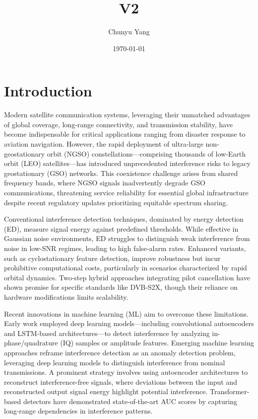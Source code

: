 \documentclass[12pt]{article}
\title{V2}
\author{Chunyu Yang}
\date{\today}
\begin{document}
\maketitle

\section{Introduction}

Modern satellite communication systems, leveraging their unmatched advantages of global coverage, long-range connectivity, and transmission stability, have become indispensable for critical applications ranging from disaster response to aviation navigation. However, the rapid deployment of ultra-large non-geostationary orbit (NGSO) constellations—comprising thousands of low-Earth orbit (LEO) satellites—has introduced unprecedented interference risks to legacy geostationary (GSO) networks. This coexistence challenge arises from shared frequency bands, where NGSO signals inadvertently degrade GSO communications, threatening service reliability for essential global infrastructure despite recent regulatory updates prioritizing equitable spectrum sharing.


Conventional interference detection techniques, dominated by energy detection (ED), measure signal energy against predefined thresholds\cite{kay2009fundamentals}. While effective in Gaussian noise environments, ED struggles to distinguish weak interference from noise in low-SNR regimes, leading to high false-alarm rates. Enhanced variants, such as cyclostationary feature detection\cite{experimentalCyclostationary}, improve robustness but incur prohibitive computational costs, particularly in scenarios characterized by rapid orbital dynamics. Two-step hybrid approaches \cite{wangCoFrequencyInterferenceAnalysis2020} integrating pilot cancellation have shown promise for specific standards like DVB-S2X, though their reliance on hardware modifications limits scalability.

Recent innovations in machine learning (ML) aim to overcome these limitations. Early work employed deep learning models—including convolutional autoencoders\cite{saifaldawlaConvolutionalAutoencodersNonGeostationary2024} and LSTM-based architectures\cite{9384473}—to detect interference by analyzing in-phase/quadrature (IQ) samples or amplitude features. Emerging machine learning approaches reframe interference detection as an anomaly detection problem, leveraging deep learning models to distinguish interference from nominal transmissions.  A prominent strategy involves using autoencoder architectures to reconstruct interference-free signals, where deviations between the input and reconstructed output signal energy highlight potential interference.  Transformer-based detectors have demonstrated state-of-the-art AUC scores by capturing long-range dependencies in interference patterns\cite{saifaldawlaGenAIBasedModelsNGSO2024}.
\end{document}
